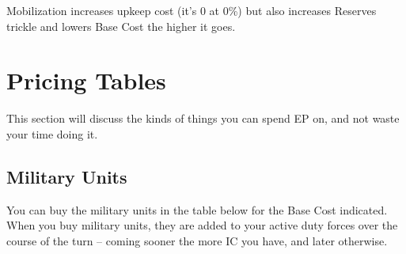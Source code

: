 \documentclass[11 pt]{scrartcl}
\begin{document}
Mobilization increases upkeep cost (it's 0 at 0\%) but also increases Reserves trickle and lowers Base Cost the higher it goes.

\pagebreak

\section{Pricing Tables}

This section will discuss the kinds of things you can spend EP on, and not waste your time doing it.

\subsection{Military Units}

You can buy the military units in the table below for the Base Cost indicated. When you buy military units, they are added to your active duty forces over the course of the turn -- coming sooner the more IC you have, and later otherwise.
\end{document}
